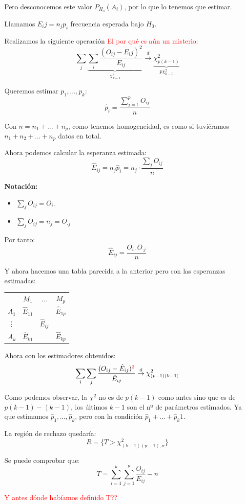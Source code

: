 \documentclass[palatino,nochap]{apuntes}
\begin{document}
Pero desconocemos este valor $P_{H_0}(A_i)$, por lo que lo tenemos que estimar.

Llamamos $E_ij =n_j p_i$ frecuencia esperada bajo $H_0$.

Realizamos la siguiente operación \textcolor{red}{El por qué es aún un misterio}:
$$ \sum_j \underbrace{\sum_i \frac{(O_{ij}-E_ij)^2}{E_{ij}}}_{\chi^2_{k-1}} \stackrel{d}{\rightarrow} \underbrace{\chi^2_{p(k-1)}}_{p\chi^2_{k-1}} $$

Queremos estimar $p_1,...,p_k$:
$$\hat{p}_i=\frac{\sum_{j=1}^p O_{ij}}{n}$$

Con $n=n_1+...+n_p$, como tenemos homogeneidad, es como si tuviéramos $n_1+n_2+...+n_p$ datos en total. 

Ahora podemos calcular la esperanza estimada:
$$\hat{E}_{ij} = n_j \hat{p}_i=n_j \cdot \frac{\sum_j O_{ij}}{n}$$

\textbf{Notación:} 
\begin{itemize}
\item $\sum_j O_{ij} = O_{i\cdot}$
\item $\sum_j O_{ij} = n_j =  O_{\cdot j}$
\end{itemize}
Por tanto:
$$\hat{E}_{ij} = \frac{O_{i\cdot} O_{\cdot j}}{n}$$

Y ahora hacemos una tabla parecida a la anterior pero con las esperanzas estimadas:

\begin{tabular}{cccc}
& $M_1$ & ... & $M_p$ \\
$A_1$ & $\hat{E}_{11}$ &  & $\hat{E}_{1p}$ \\
\vdots &  & $\hat{E}_{ij}$ &  \\
$A_k$ & $\hat{E}_{k1}$ &  & $\hat{E}_{kp}$ \\
\end{tabular}

Ahora con los estimadores obtenidos:
$$ \sum_i \sum_j \frac{(O_{ij}-\hat{E}_{ij})^{\textcolor{red}{2}}}{\hat{E}_{ij}} \stackrel{d}{\rightarrow} \chi^2_{(p-1)(k-1)} $$

Como podemos observar, la $\chi^2$ no es de $p(k-1)$ como antes sino que es de $p(k-1)-(k-1)$, los últimos $k-1$ son el nº de parámetros estimados. Ya que estimamos $\hat{p}_1,...,\hat{p}_k$, pero con la condición $\hat{p}_1+...+\hat{p}_k  1$.

La región de rechazo quedaría:
$$ R=\{T > \chi^2_{(k-1)(p-1),\alpha}\}$$

\begin{obs}
Se puede comprobar que:
$$ T = \sum_{i=1}^k \sum_{j=1}^p \frac{O_{ij}}{E_{ij}}-n$$

\textcolor{red}{Y antes dónde habíamos definido T??}
\end{obs}
\end{document}
